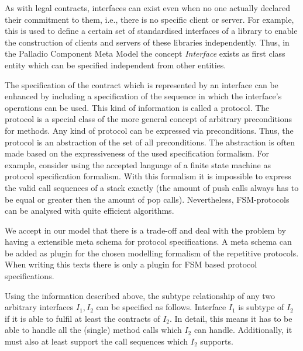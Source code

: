 As with legal contracts, interfaces can exist even when no one actually declared their commitment to them, i.e., there is no specific client or server. For example, this is used to define a certain set of standardised interfaces of a library to enable the construction of clients and servers of these libraries independently. Thus, in the Palladio Component Meta Model the concept \emph{Interface} exists as first class entity which can be specified independent from other entities.


The specification of the contract which is represented by an interface can be enhanced by including a specification of the sequence in which the interface's operations can be used. This kind of information is called a protocol. The protocol is a special class of the more general concept of arbitrary preconditions for methods. Any kind of protocol can be expressed via preconditions. Thus, the protocol is an abstraction of the set of all preconditions. The abstraction is often made based on the expressiveness of the used specification formalism. For example, consider using the accepted language of a finite state machine as protocol specification formalism. With this formalism it is impossible to express the valid call sequences of a stack exactly (the amount of push calls always has to be equal or greater then the amount of pop calls). Nevertheless, FSM-protocols can be analysed with quite efficient algorithms. 

We accept in our model that there is a trade-off and deal with the problem by having a extensible meta schema for protocol specifications. A meta schema can be added as plugin for the chosen modelling formalism of the repetitive protocols. When writing this texts there is only a plugin for FSM based protocol specifications.

Using the information described above, the subtype relationship of any two arbitrary interfaces $I_1,I_2$ can be specified as follows. Interface $I_1$ is subtype of $I_2$ if it is able to fulfil at least the contracts of $I_2$. In detail, this means it has to be able to handle all the (single) method calls which $I_2$ can handle. Additionally, it must also at least support the call sequences which $I_2$ supports.


